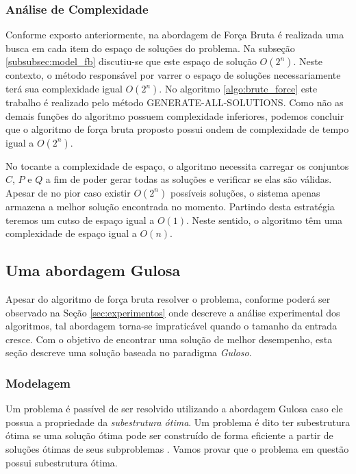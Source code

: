 \documentclass[12pt]{article}
\begin{document}
\subsubsection{Análise de Complexidade}
\label{subsubsec:fb_analise_complexidade}

Conforme exposto anteriormente, na abordagem de Força Bruta é realizada uma busca em cada item do espaço de soluções do problema. Na subseção \ref{subsubsec:model_fb} discutiu-se que este espaço de solução $O(2^{n})$. Neste contexto, o método responsável por varrer o espaço de soluções necessariamente terá sua complexidade igual $O(2^{n})$. No algoritmo \ref{algo:brute_force} este trabalho é realizado pelo método \textsc{GENERATE-ALL-SOLUTIONS}{}. Como não as demais funções do algoritmo possuem complexidade inferiores, podemos concluir que o algoritmo de força bruta proposto possui ondem de complexidade de tempo igual a $O(2^{n})$.

No tocante a complexidade de espaço, o algoritmo necessita carregar os conjuntos $C$, $P$ e $Q$ a fim de poder gerar todas as soluções e verificar se elas são válidas. Apesar de no pior caso existir $O(2^{n})$ possíveis soluções, o sistema apenas armazena a melhor solução encontrada no momento. Partindo desta estratégia teremos um cutso de espaço igual a $O(1)$. Neste sentido, o algoritmo têm uma complexidade de espaço igual a $O(n)${}.

\subsection{Uma abordagem Gulosa}
\label{subsec:guloso}

Apesar do algoritmo de força bruta resolver o problema, conforme poderá ser observado na Seção \ref{sec:experimentos} onde descreve a análise experimental dos algoritmos, tal abordagem torna-se impraticável quando o tamanho da entrada cresce. Com o objetivo de encontrar uma solução de melhor desempenho, esta seção descreve uma solução baseada no paradigma \textit{Guloso}.

\subsubsection{Modelagem}
\label{subsubsec:model_guloso}
Um problema é passível de ser resolvido utilizando a abordagem Gulosa caso ele possua a propriedade da \textit{subestrutura ótima}{}. Um problema é dito ter subestrutura ótima se uma solução ótima pode ser construído de forma eficiente a partir de soluções ótimas de seus subproblemas \cite{Cormen:2009:IAT:1614191}{}. Vamos provar que o problema em  questão possui subestrutura ótima.
\end{document}
